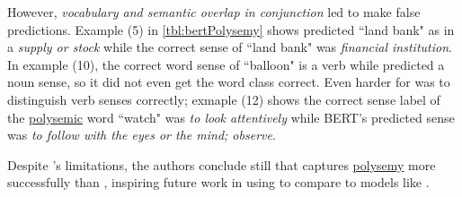However, \emph{vocabulary and semantic overlap in conjunction} led  to make false predictions. Example (5) in \cref{tbl:bertPolysemy} shows  predicted ``land bank" as in a \emph{supply or stock} while the correct sense of ``land bank" was \emph{financial institution}. In example (10), the correct word sense of ``balloon" is a verb while  predicted a noun sense, so it did not even get the word class correct. Even harder for  was to distinguish verb senses correctly; exmaple (12) shows the correct sense label of the \hyperref[sec:Polysemy]{polysemic} word ``watch" was \emph{to look attentively} while BERT's predicted sense was \emph{to follow with the eyes or the mind; observe}. 

Despite 's limitations, the authors conclude still that  captures \hyperref[sec:Polysemy]{polysemy} more successfully than , inspiring future work in using  to compare  to models like . 
